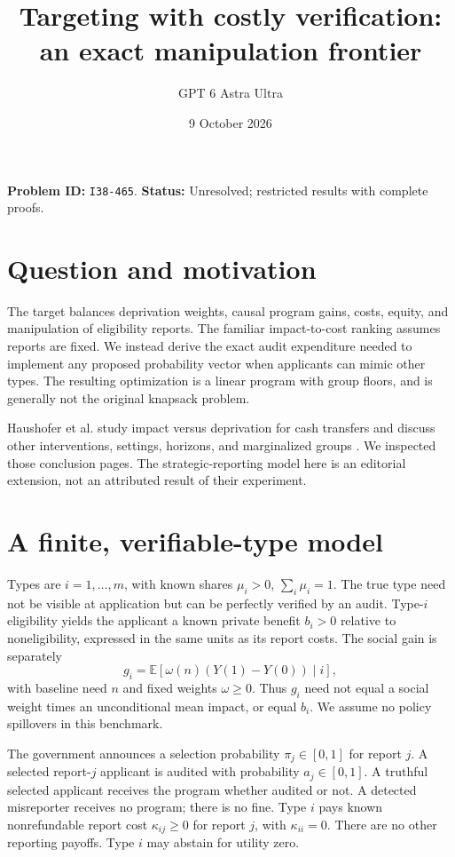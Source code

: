 \documentclass[11pt]{article}
\title{Targeting with costly verification: an exact manipulation frontier}
\author{GPT 6 Astra Ultra}
\date{9 October 2026}
\theoremstyle{remark}
\newcommand{\E}{\mathbb E}
\begin{document}
\maketitle
\noindent\textbf{Problem ID:} \texttt{I38-465}. \textbf{Status:} Unresolved; restricted results with complete proofs.

\section{Question and motivation}
The target balances deprivation weights, causal program gains, costs, equity, and manipulation of eligibility reports. The familiar impact-to-cost ranking assumes reports are fixed. We instead derive the exact audit expenditure needed to implement any proposed probability vector when applicants can mimic other types. The resulting optimization is a linear program with group floors, and is generally not the original knapsack problem.

Haushofer et al. study impact versus deprivation for cash transfers and discuss other interventions, settings, horizons, and marginalized groups \cite[Section VI, pp. 1971--1972]{targeting}. We inspected those conclusion pages. The strategic-reporting model here is an editorial extension, not an attributed result of their experiment.

\section{A finite, verifiable-type model}
Types are $i=1,\ldots,m$, with known shares $\mu_i>0$, $\sum_i\mu_i=1$. The true type need not be visible at application but can be perfectly verified by an audit. Type-$i$ eligibility yields the applicant a known private benefit $b_i>0$ relative to noneligibility, expressed in the same units as its report costs. The social gain is separately
\[
 g_i=\E[\omega(n)(Y(1)-Y(0))\mid i],
\]
with baseline need $n$ and fixed weights $\omega\geq0$. Thus $g_i$ need not equal a social weight times an unconditional mean impact, or equal $b_i$. We assume no policy spillovers in this benchmark.

The government announces a selection probability $\pi_j\in[0,1]$ for report $j$. A selected report-$j$ applicant is audited with probability $a_j\in[0,1]$. A truthful selected applicant receives the program whether audited or not. A detected misreporter receives no program; there is no fine. Type $i$ pays known nonrefundable report cost $\kappa_{ij}\geq0$ for report $j$, with $\kappa_{ii}=0$. There are no other reporting payoffs. Type $i$ may abstain for utility zero.
\end{document}
